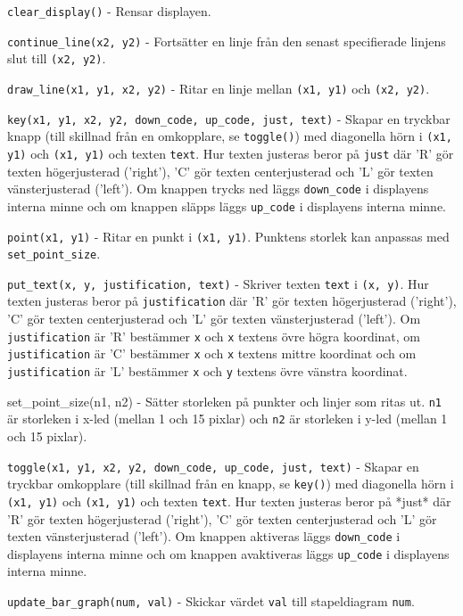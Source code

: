 \texttt{clear\_display()} - Rensar displayen.

\texttt{continue\_line(x2, y2)} - Fortsätter en linje från den senast specifierade
linjens slut till \texttt{(x2, y2)}.

\texttt{draw\_line(x1, y1, x2, y2)} - Ritar en linje mellan \texttt{(x1, y1)} och
\texttt{(x2, y2)}.

\texttt{key(x1, y1, x2, y2, down\_code, up\_code, just, text)} - Skapar en
tryckbar knapp (till skillnad från en omkopplare, se \texttt{toggle()}) med
diagonella hörn i \texttt{(x1, y1)} och \texttt{(x1, y1)} och texten \texttt{text}. Hur
texten justeras beror på \texttt{just} där 'R' gör texten högerjusterad ('right'), 'C'
gör texten centerjusterad och 'L' gör texten vänsterjusterad ('left'). Om
knappen trycks ned läggs \texttt{down\_code} i displayens interna minne och om knappen
släpps läggs \texttt{up\_code} i displayens interna minne.

\texttt{point(x1, y1)} - Ritar en punkt i \texttt{(x1, y1)}. Punktens storlek kan
anpassas med \texttt{set\_point\_size}.

\texttt{put\_text(x, y, justification, text)} - Skriver texten \texttt{text} i
\texttt{(x, y)}. Hur texten justeras beror på \texttt{justification} där 'R' gör
texten högerjusterad ('right'), 'C' gör texten centerjusterad och 'L' gör texten
vänsterjusterad ('left'). Om \texttt{justification} är 'R' bestämmer \texttt{x}
och \texttt{x} textens övre högra koordinat, om \texttt{justification} är 'C'
bestämmer \texttt{x} och \texttt{x} textens mittre koordinat och om
\texttt{justification} är 'L' bestämmer \texttt{x} och \texttt{y} textens övre
vänstra koordinat.

set\_point\_size(n1, n2) - Sätter storleken på punkter och linjer som ritas ut.
\texttt{n1} är storleken i x-led (mellan 1 och 15 pixlar) och \texttt{n2} är
storleken i y-led (mellan 1 och 15 pixlar).

\texttt{toggle(x1, y1, x2, y2, down\_code, up\_code, just, text)} - Skapar en
tryckbar omkopplare (till skillnad från en knapp, se \texttt{key()}) med
diagonella hörn i \texttt{(x1, y1)} och \texttt{(x1, y1)} och texten
\texttt{text}. Hur texten justeras beror på *just* där 'R' gör texten
högerjusterad ('right'), 'C' gör texten centerjusterad och 'L' gör texten
vänsterjusterad ('left'). Om knappen aktiveras läggs \texttt{down\_code} i
displayens interna minne och om knappen avaktiveras läggs \texttt{up\_code} i
displayens interna minne.

\texttt{update\_bar\_graph(num, val)} - Skickar värdet \texttt{val} till
stapeldiagram \texttt{num}.
